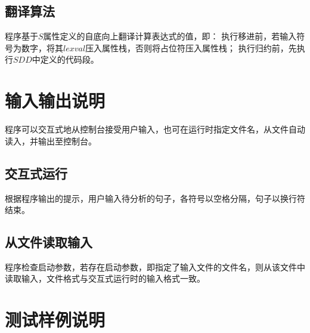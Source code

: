 \documentclass[UTF8]{ctexart}
\begin{document}
\subsection{翻译算法}
程序基于$S$属性定义的自底向上翻译计算表达式的值，即：
执行移进前，若输入符号为数字，将其$lexval$压入属性栈，否则将占位符压入属性栈；
执行归约前，先执行$SDD$中定义的代码段。
\section{输入输出说明}
程序可以交互式地从控制台接受用户输入，也可在运行时指定文件名，从文件自动读入，并输出至控制台。
\subsection{交互式运行}
根据程序输出的提示，用户输入待分析的句子，各符号以空格分隔，句子以换行符结束。
\subsection{从文件读取输入}
程序检查启动参数，若存在启动参数，即指定了输入文件的文件名，则从该文件中读取输入，文件格式与交互式运行时的输入格式一致。
\section{测试样例说明}
\end{document}
